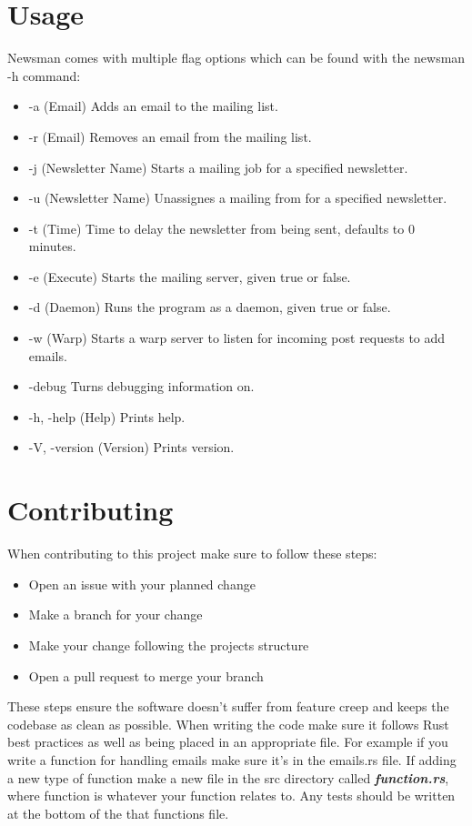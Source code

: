 \documentclass[12pt]{article}
\begin{document}
\section{Usage}
Newsman comes with multiple flag options which can be found with the newsman -h 
command:

\begin{itemize}
    \item -a (Email) Adds an email to the mailing list.
    \item -r (Email) Removes an email from the mailing list.
    \item -j (Newsletter Name) Starts a mailing job for a specified newsletter. 
    \item -u (Newsletter Name) Unassignes a mailing from for a specified newsletter.
    \item -t (Time) Time to delay the newsletter from being sent, defaults to 
        0 minutes.
    \item -e (Execute) Starts the mailing server, given true or false.
    \item -d (Daemon) Runs the program as a daemon, given true or false. 
    \item -w (Warp) Starts a warp server to listen for incoming post requests to add emails.
    \item -\-debug Turns debugging information on.
    \item -h, -\-help (Help) Prints help.
    \item -V, -\-version (Version) Prints version.
\end{itemize}

\section{Contributing}
When contributing to this project make sure to follow these steps:

\begin{itemize}
    \item Open an issue with your planned change
    \item Make a branch for your change
    \item Make your change following the projects structure
    \item Open a pull request to merge your branch
\end{itemize}

These steps ensure the software doesn't suffer from feature creep and keeps the 
codebase as clean as possible. When writing the code make sure it follows Rust 
best practices as well as being placed in an appropriate file. For example if 
you write a function for handling emails make sure it's in the emails.rs file. 
If adding a new type of function make a new file in the src directory 
called \textbf{\textit{function.rs}}, where function is whatever your function 
relates to. Any tests should be written at the bottom of the that functions file.
\end{document}
